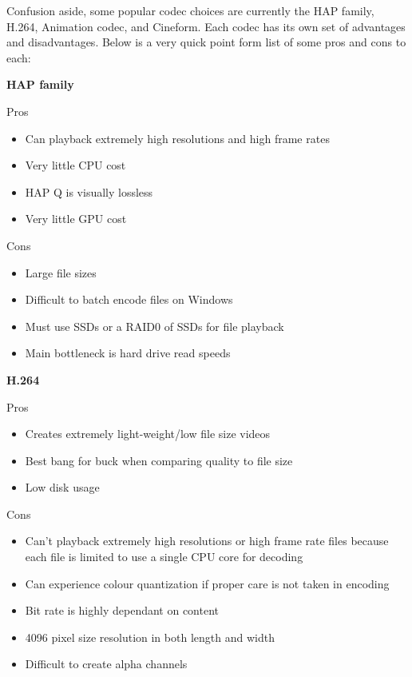 \begin{fullwidth}
Confusion aside, some popular codec choices are currently the HAP family, H.264, Animation codec, and Cineform. Each codec has its own set of advantages and disadvantages. Below is a very quick point form list of some pros and cons to each:

\vspace{3mm}

\noindent \textbf{HAP family}

\vspace{3mm}

Pros
\begin{itemize}
\item Can playback extremely high resolutions and high frame rates
\item Very little CPU cost
\item HAP Q is visually lossless
\item Very little GPU cost
\end{itemize}

\vspace{3mm}

Cons
\begin{itemize}
\item Large file sizes
\item Difficult to batch encode files on Windows
\item Must use SSDs or a RAID0 of SSDs for file playback
\item Main bottleneck is hard drive read speeds
\end{itemize}

\vspace{6mm}

\noindent \textbf{H.264}

\vspace{3mm}

Pros
\begin{itemize}
\item Creates extremely light-weight/low file size videos
\item Best bang for buck when comparing quality to file size
\item Low disk usage
\end{itemize}

\vspace{3mm}

Cons
\begin{itemize}
\item Can't playback extremely high resolutions or high frame rate files because each file is limited to use a single CPU core for decoding
\item Can experience colour quantization if proper care is not taken in encoding
\item Bit rate is highly dependant on content
\item 4096 pixel size resolution in both length and width
\item Difficult to create alpha channels
\end{itemize}


\end{fullwidth}
